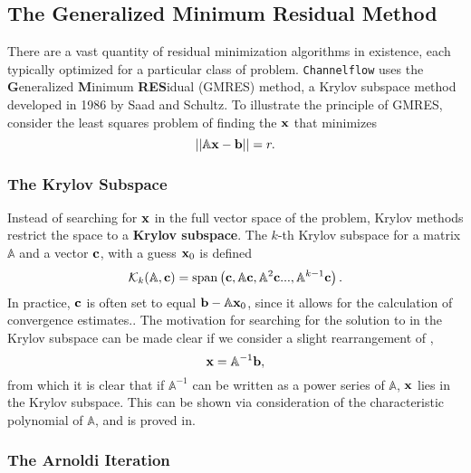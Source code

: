\subsection{The Generalized Minimum Residual Method}

There are a vast quantity of residual minimization algorithms in existence, each typically optimized for a particular class of problem. {\tt Channelflow} uses the {\bf G}eneralized {\bf M}inimum {\bf RES}idual (GMRES) method, a Krylov subspace method developed in 1986 by Saad and Schultz. To illustrate the principle of GMRES, consider the least squares problem of finding the $\mathbf{x}$ that minimizes
\begin{equation}\label{eq:AXB}
||\mathbb{A}\mathbf{x} -\mathbf{b}|| = r.
\end{equation}

\subsubsection{The Krylov Subspace}
Instead of searching for $\mathbf{x}$ in the full vector space of the problem, Krylov methods restrict the space to a {\bf Krylov subspace}. The $k$-th Krylov subspace for a matrix $\mathbb{A}$ and a vector $\mathbf{c}$, with a guess $\mathbf{x}_0$ is defined
\begin{equation}\label{eq:krylov}
\mathcal{K}_k(\mathbb{A},\mathbf{c}) = \mathrm{span}\left ( \mathbf{c},\mathbb{A}\mathbf{c},\mathbb{A}^2\mathbf{c}...,\mathbb{A}^{k-1}\mathbf{c} \right ).
 \end{equation}
In practice, $\mathbf{c}$ is often set to equal $\mathbf{b} - \mathbb{A}\mathbf{x}_0$, since it allows for the calculation of convergence estimates.. The motivation for searching for the solution to  in the Krylov subspace can be made clear if we consider a slight rearrangement of ,
 \begin{equation}
 \mathbf{x} = \mathbb{A}^{-1}\mathbf{b},
 \end{equation}
 from which it is clear that if $\mathbb{A}^{-1}$ can be written as a power series of $\mathbb{A}$, $\mathbf{x}$ lies in the Krylov subspace. This can be shown via consideration of the characteristic polynomial of $\mathbb{A}$, and is proved in. 
 
 \subsubsection{The Arnoldi Iteration}
 
